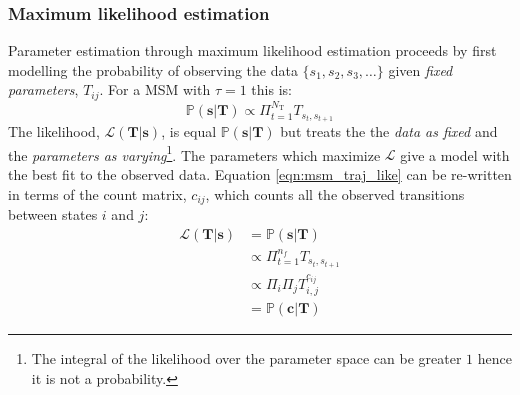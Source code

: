 \subsubsection{Maximum likelihood estimation}
Parameter estimation through maximum likelihood estimation proceeds by first modelling  the probability of observing the data $\{s_{1}, s_{2}, s_{3}, \ldots \}$ given \emph{fixed parameters}, $T_{ij}$. \cite{wasserman2013all} For a MSM  with  $\tau=1$ this is: \cite{trendelkamp-schroerEstimationUncertaintyReversible2015b} 
\begin{equation}\label{eqn:msm_traj_like}
    \mathbb{P}(\mathbf{s}|\mathbf{T}) \propto \Pi_{t=1}^{N_{\mathrm{T}}} T_{s_{t}, s_{t+1}}
\end{equation}
The likelihood, $\mathcal{L}(\mathbf{T}|\mathbf{s})$, is equal $\mathbb{P}(\mathbf{s}|\mathbf{T})$ but treats the the \emph{data as fixed} and the \emph{parameters as varying}\footnote{The integral of the likelihood over the parameter space can be greater $1$ hence it is not a probability.}. \cite{wasserman2013all} The parameters which maximize $\mathcal{L}$ give a model with the best fit to the observed data. \cite{wasserman2013all} Equation \ref{eqn:msm_traj_like} can be re-written in terms of the count matrix, $c_{ij}$, which counts all the observed transitions between states $i$ and $j$: \cite{trendelkamp-schroerEstimationUncertaintyReversible2015b}
\begin{align}
    \mathcal{L}(\mathbf{T}|\mathbf{s}) & = \mathbb{P}(\mathbf{s}|\mathbf{T}) \\
    & \propto \Pi_{t=1}^{n_{f}} T_{s_{t}, s_{t+1}} \\ 
    & \propto \Pi_{i}\Pi_{j}T_{i, j}^{c_{ij}} \\
    & = \mathbb{P}(\mathbf{c}|\mathbf{T}) \label{eqn:msm_count_like}
\end{align}

